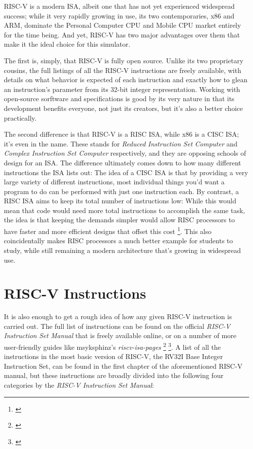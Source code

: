 \documentclass[12pt,twoside]{reedthesis}
\begin{document}
RISC-V is a modern ISA, albeit one that has not yet experienced widespread success; while it very rapidly growing in use, its two contemporaries, x86 and ARM, dominate the Personal Computer CPU and Mobile CPU market entirely for the time being. And yet, RISC-V has two major advantages over them that make it the ideal choice for this simulator.

The first is, simply, that RISC-V is fully open source. Unlike its two proprietary cousins, the full listings of all the RISC-V instructions are freely available, with details on what behavior is expected of each instruction and exactly how to glean an instruction's parameter from its 32-bit integer representation. Working with open-source sorftware and specifications is good by its very nature in that its development benefits everyone, not just its creators, but it's also a better choice practically.

The second difference is that RISC-V is a RISC ISA, while x86 is a CISC ISA; it's even in the name. These stands for \textit{Reduced Instruction Set Computer} and \textit{Complex Instruction Set Computer} respectively, and they are opposing schools of design for an ISA. The difference ultimately comes down to how many different instructions the ISA lists out: The idea of a CISC ISA is that by providing a very large variety of different instructions, most individual things you'd want a program to do can be performed with just one instruction each. By contrast, a RISC ISA aims to keep its total number of instructions low: While this would mean that code would need more total instructions to accomplish the same task, the idea is that keeping the demands simpler would allow RISC processors to have faster and more efficient designs that offset this cost \footnote{\cite{denning}}. This also coincidentally makes RISC processors a much better example for students to study, while still remaining a modern architecture that's growing in widespread use.


\section{RISC-V Instructions}

It is also enough to get a rough idea of how any given RISC-V instruction is carried out. The full list of instructions can be found on the official \textit{RISC-V Instruction Set Manual} that is freely available online, or on a number of more user-friendly guides like msyksphinz's \textit{riscv-isa-pages} \footnote{\cite{waterman}} \footnote{\cite{msyksphinz}}. A list of all the instructions in the most basic version of RISC-V, the RV32I Base Integer Instruction Set, can be found in the first chapter of the aforementioned RISC-V manual, but these instructions are broadly divided into the following four categories by the \textit{RISC-V Instruction Set Manual}:
\end{document}
